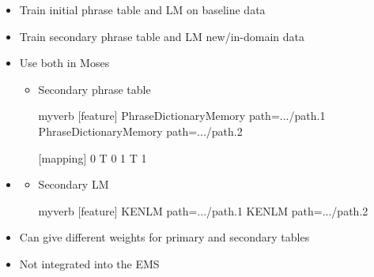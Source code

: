 \documentclass[landscape]{uedslides2C}
\begin{document}

\begin{itemize} \itemsep -1mm
\item Train initial phrase table and LM on baseline data

\item Train secondary phrase table and LM new/in-domain data

\item Use both in Moses
  \begin{itemize}

  \item Secondary phrase table
  \begin{SaveVerbatim}{myverb} 
    [feature]
    PhraseDictionaryMemory path=.../path.1
    PhraseDictionaryMemory path=.../path.2
    
    [mapping]
    0 T 0
    1 T 1
  \end{SaveVerbatim}
  \colorbox{gray}{}

  \end{itemize}
\end{itemize}


\begin{itemize} \itemsep -1mm
  \item
  \begin{itemize}
  \item Secondary LM\\[4mm]
  \begin{SaveVerbatim}{myverb} 
    [feature]
    KENLM path=.../path.1
    KENLM path=.../path.2
  \end{SaveVerbatim}
  \colorbox{gray}{}

  \end{itemize}

  \item Can give different weights for primary and secondary tables
  \item Not integrated into the EMS
\end{itemize}
\end{document}
